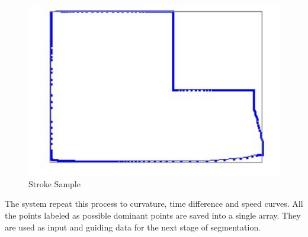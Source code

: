 \documentclass[a4paper,10pt]{IEEEconf}
\begin{document}
\begin{figure}[]
	\centering
		\includegraphics[scale=0.3]{images/orignalStroke.pdf}
	\caption{Stroke Sample}
	\label{fig:orignalStroke}
\end{figure}
The system repeat this process to curvature, time difference and speed curves. All the points labeled as possible dominant points are saved into a single array. They are used as input and guiding data for the next stage of segmentation. 
\end{document}
